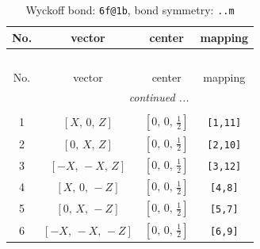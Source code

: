 \documentclass[fleqn,8pt]{jsarticle}
\begin{document}
\begin{longtable}{cccc}
\caption{Wyckoff bond: {\tt 6f@1b}, bond symmetry: {\tt ..m}}
 \\
 \hline \hline
No. & vector & center & mapping \\ \hline \endfirsthead

\multicolumn{3}{l}{\tablename\ \thetable{}} \\
 \hline \hline
No. & vector & center & mapping \\ \hline \endhead

 \hline \hline
\multicolumn{3}{r}{\footnotesize\it continued ...} \\ \endfoot

 \hline \hline
\multicolumn{3}{r}{} \\ \endlastfoot

1 & $\left[ X,\, 0,\, Z \right]$ & $\left[ 0,\, 0,\, \frac{1}{2} \right]$ & {\tt [1,11]} \\ \hline
2 & $\left[ 0,\, X,\, Z \right]$ & $\left[ 0,\, 0,\, \frac{1}{2} \right]$ & {\tt [2,10]} \\ \hline
3 & $\left[ - X,\, - X,\, Z \right]$ & $\left[ 0,\, 0,\, \frac{1}{2} \right]$ & {\tt [3,12]} \\ \hline
4 & $\left[ X,\, 0,\, - Z \right]$ & $\left[ 0,\, 0,\, \frac{1}{2} \right]$ & {\tt [4,8]} \\ \hline
5 & $\left[ 0,\, X,\, - Z \right]$ & $\left[ 0,\, 0,\, \frac{1}{2} \right]$ & {\tt [5,7]} \\ \hline
6 & $\left[ - X,\, - X,\, - Z \right]$ & $\left[ 0,\, 0,\, \frac{1}{2} \right]$ & {\tt [6,9]} \\
\end{longtable}
\renewcommand{\arraystretch}{1.2}
\end{document}
